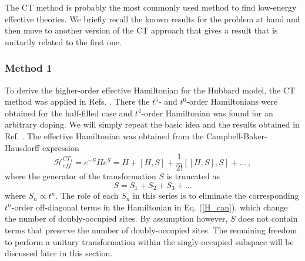 \documentclass[floatfix,twocolumn,aps,prb,showpacs,superscriptaddress]{revtex4}
\begin{document}
The CT  method is probably the most commonly used
method to find low-energy effective theories. We briefly recall the known
results for the problem at hand and then move to another version of the
CT approach that gives a result that is unitarily
related to the first one.


\subsubsection{Method 1}


To derive the higher-order effective Hamiltonian for the Hubbard model, the
CT method was applied in Refs. .
There the $t^{5}$- and $t^{6}$-order Hamiltonians were obtained for the
half-filled case and $t^{4}$-order Hamiltonian was found for an arbitrary
doping. We will simply repeat the basic idea and the results obtained in
Ref. . The effective Hamiltonian was obtained from
the Campbell-Baker-Hausdorff expression
\begin{equation}
\mathcal{H}_{eff}^{CT_{1}}=e^{-S}He^{S}=H+[H,S]+\frac{1}{2!}[[H,S],S]+\dots
\ ,  \label{H_can}
\end{equation}%
where the generator of the transformation $S$ is truncated as
\[
S=S_{1}+S_{2}+S_{3}+\dots
\]%
where $S_n\propto t^n$. The role of each
$S_{n}$ in this series is to eliminate the corresponding $t^{n}$-order
off-diagonal terms in the Hamiltonian in Eq. (\ref{H_can}), which change the
number of doubly-occupied sites. By assumption however, $S$ does not contain
terms that preserve the number of doubly-occupied sites. The remaining
freedom to perform a unitary transformation within the singly-occupied
subspace will be discussed later in this section.
\end{document}
